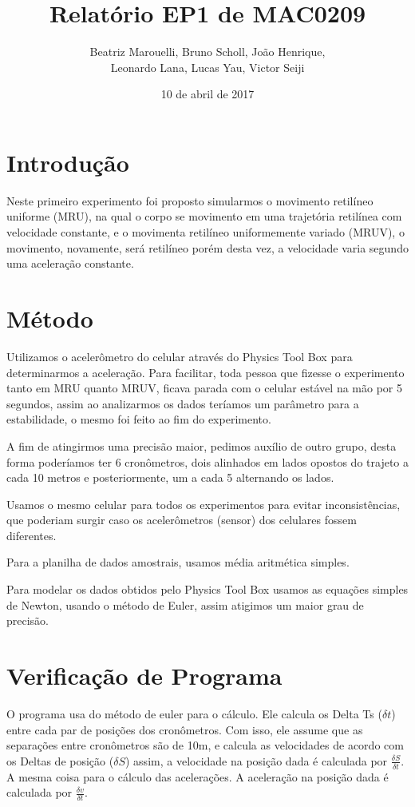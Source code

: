 \documentclass[a4paper, 12pt]{article}
\title{Relatório EP1 de MAC0209}
\author{Beatriz Marouelli, Bruno Scholl, João Henrique, 
\\ Leonardo Lana, Lucas Yau, Victor Seiji}
\date{10 de abril de 2017}
\begin{document}
\maketitle

\section*{Introdução}
Neste primeiro experimento foi proposto simularmos o movimento retilíneo
uniforme (MRU), na qual o corpo se movimento em uma trajetória retilínea com
velocidade constante, e o movimenta retilíneo uniformemente variado (MRUV),
o movimento, novamente, será retilíneo porém desta vez, a velocidade varia
segundo uma aceleração constante.

\section*{Método}
Utilizamos o acelerômetro do celular através do Physics Tool Box para
determinarmos a aceleração. Para facilitar, toda pessoa que fizesse o experimento 
tanto em MRU quanto MRUV, ficava parada com o celular estável na mão por 5 segundos, 
assim ao analizarmos os dados teríamos um parâmetro para a estabilidade, o mesmo 
foi feito ao fim do experimento.

A fim de atingirmos uma precisão maior, pedimos auxílio de outro grupo, desta
forma poderíamos ter 6 cronômetros, dois alinhados em lados opostos do trajeto
a cada 10 metros e posteriormente, um a cada 5 alternando os lados.

Usamos o mesmo celular para todos os experimentos para evitar inconsistências,
que poderiam surgir caso os acelerômetros (sensor) dos celulares fossem diferentes.

Para a planilha de dados amostrais, usamos média aritmética simples.

Para modelar os dados obtidos pelo Physics Tool Box usamos as equações simples
de Newton, usando o método de Euler, assim atigimos um maior grau de precisão.

\section*{Verificação de Programa}
O programa usa do método de euler para o cálculo. Ele calcula os Delta Ts
($\delta t$) entre cada par de posições dos cronômetros. Com isso, ele assume
que as separações entre cronômetros são de 10m, e calcula as velocidades de
acordo com os Deltas de posição ($\delta S$) assim, a velocidade na posição dada
é calculada por $\frac{\delta S}{\delta t}$.
A mesma coisa para o cálculo das acelerações. A aceleração na posição dada é
calculada por $\frac{\delta v}{\delta t}$.
\end{document}

